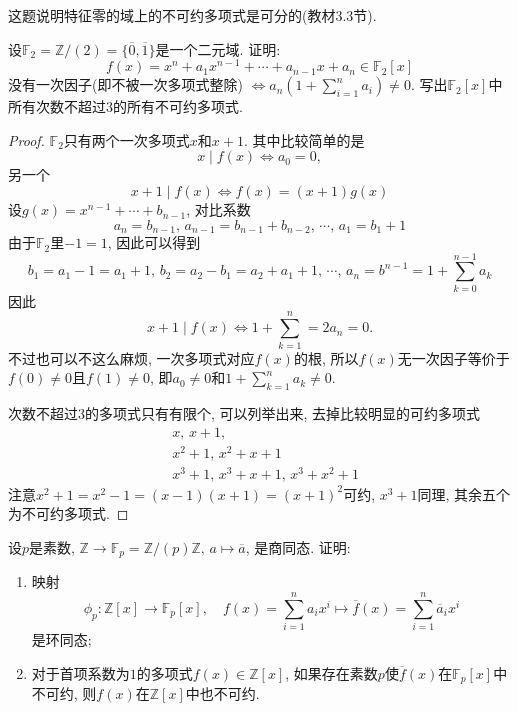 \begin{remark}
    这题说明特征零的域上的不可约多项式是可分的(教材3.3节).
\end{remark}

\begin{problem}
    设$\mathbb{F}_2 = \mathbb{Z}/(2) = \{\overline{0}, \overline{1}\}$是一个二元域. 证明:
    \[
        f(x) = x^n + a_1x^{n - 1} + \cdots + a_{n - 1}x + a_n \in \mathbb{F}_2[x]
    \]
    没有一次因子(即不被一次多项式整除)
    \(
        \Leftrightarrow a_n\left(1 + \sum_{i = 1}^n a_i\right) \neq 0.
    \)
    写出$\mathbb{F}_2[x]$中所有次数不超过$3$的所有不可约多项式.
\end{problem}

\begin{proof}
    $\mathbb{F}_2$只有两个一次多项式$x$和$x + 1$. 其中比较简单的是
    \[
        x \mid f(x) \iff a_0 = 0,
    \]
    另一个
    \[
        x + 1 \mid f(x) \iff f(x) = (x + 1)g(x)
    \]
    设$g(x) = x^{n - 1} + \cdots + b_{n - 1}$, 对比系数
    \[
        a_n = b_{n - 1},\, a_{n - 1} = b_{n - 1} + b_{n - 2},\, \cdots,\, a_{1} = b_1 + 1
    \]
    由于$\mathbb{F}_2$里$-1 = 1$, 因此可以得到
    \[
        b_1 = a_1 - 1 = a_1 + 1,\, b_2 = a_2 - b_1 = a_2 + a_1 + 1,\, \cdots,\, a_n = b^{n - 1} = 1 + \sum_{k = 0}^{n - 1} a_k
    \]
    因此
    \[
        x + 1 \mid f(x) \iff 1 + \sum_{k = 1}^{n} = 2a_n = 0.
    \]
    不过也可以不这么麻烦, 一次多项式对应$f(x)$的根, 所以$f(x)$无一次因子等价于$f(0) \neq 0$且$f(1) \neq 0$, 即$a_0 \neq 0$和$1 + \sum_{k = 1}^{n} a_k \neq 0$.

    次数不超过$3$的多项式只有有限个, 可以列举出来, 去掉比较明显的可约多项式
    \[
    \begin{aligned}
        &x,\, x + 1,\\
        &x^2 + 1,\, x^2 + x + 1\\
        &x^3 + 1,\, x^3 + x + 1,\, x^3 + x^2 + 1
    \end{aligned}
    \]
    注意$x^2 + 1 = x^2 - 1 = (x - 1)(x + 1) = (x + 1)^2$可约, $x^3 + 1$同理, 其余五个为不可约多项式.
\end{proof}

\begin{problem}
    设$p$是素数, $\mathbb{Z} \to \mathbb{F}_p = \mathbb{Z}/(p)\mathbb{Z},\, a \mapsto \overline{a}$, 是商同态. 证明:
    \begin{enumerate}[(1)]
        \item 映射
        \[
            \phi_p:\mathbb{Z}[x] \to \mathbb{F}_p[x],\quad f(x) = \sum_{i = 1}^n a_ix^i \mapsto \overline{f}(x) = \sum_{i = 1}^n \overline{a}_ix^i
        \]
        是环同态;
        \item 对于首项系数为$1$的多项式$f(x) \in \mathbb{Z}[x]$, 如果存在素数$p$使$\overline{f}(x)$在$\mathbb{F}_p[x]$中不可约, 则$f(x)$在$\mathbb{Z}[x]$中也不可约.
    \end{enumerate}
\end{problem}

